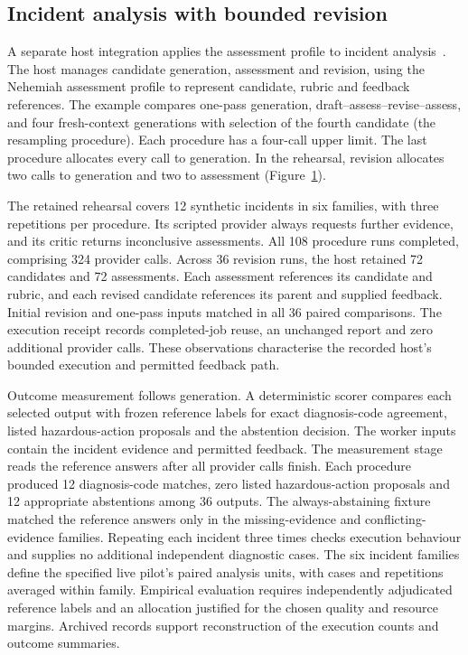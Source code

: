 \documentclass[preprint,12pt,a4paper]{elsarticle}
\begin{document}
\subsection{Incident analysis with bounded revision}
A separate host integration applies the assessment profile to incident analysis~\citep{incidentRevision}. The host manages candidate generation, assessment and revision, using the Nehemiah assessment profile to represent candidate, rubric and feedback references. The example compares one-pass generation, draft--assess--revise--assess, and four fresh-context generations with selection of the fourth candidate (the resampling procedure). Each procedure has a four-call upper limit. The last procedure allocates every call to generation. In the rehearsal, revision allocates two calls to generation and two to assessment (Figure~\ref{fig:incident-rehearsal}).

The retained rehearsal covers 12 synthetic incidents in six families, with three repetitions per procedure. Its scripted provider always requests further evidence, and its critic returns inconclusive assessments. All 108 procedure runs completed, comprising 324 provider calls. Across 36 revision runs, the host retained 72 candidates and 72 assessments. Each assessment references its candidate and rubric, and each revised candidate references its parent and supplied feedback. Initial revision and one-pass inputs matched in all 36 paired comparisons. The execution receipt records completed-job reuse, an unchanged report and zero additional provider calls. These observations characterise the recorded host's bounded execution and permitted feedback path.

\begin{figure}[htbp]
\centering

\caption[Recorded incident procedures]{\protect}\label{fig:incident-rehearsal}
\end{figure}

Outcome measurement follows generation. A deterministic scorer compares each selected output with frozen reference labels for exact diagnosis-code agreement, listed hazardous-action proposals and the abstention decision. The worker inputs contain the incident evidence and permitted feedback. The measurement stage reads the reference answers after all provider calls finish. Each procedure produced 12 diagnosis-code matches, zero listed hazardous-action proposals and 12 appropriate abstentions among 36 outputs. The always-abstaining fixture matched the reference answers only in the missing-evidence and conflicting-evidence families. Repeating each incident three times checks execution behaviour and supplies no additional independent diagnostic cases. The six incident families define the specified live pilot's paired analysis units, with cases and repetitions averaged within family. Empirical evaluation requires independently adjudicated reference labels and an allocation justified for the chosen quality and resource margins. Archived records support reconstruction of the execution counts and outcome summaries.
\end{document}
